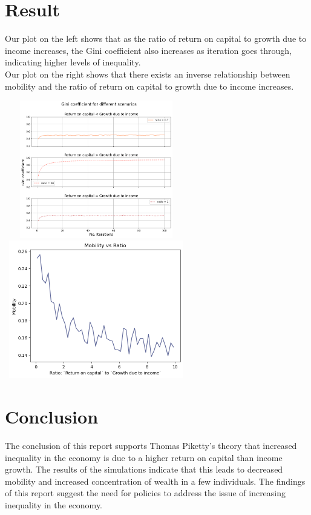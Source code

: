 \documentclass{article}
\begin{document}
\section*{Result}
\vspace{-0.3cm}

Our plot on the left shows that as the ratio of return on capital to growth due to income increases, 
the Gini coefficient also increases as iteration goes through, indicating higher levels of inequality. \\
Our plot on the right shows that there exists an inverse relationship between mobility and the ratio of return on capital to growth due to income increases.

\vspace{0.3cm}
\includegraphics[width=8cm,height=6cm]{ratio_comparison.png}
\hspace{0.2cm}
\includegraphics[width=8cm,height=6cm]{Mobility.png}

\vspace{-0.4cm}
\section*{Conclusion}
The conclusion of this report supports Thomas Piketty's theory that increased inequality in the economy is due to a higher
return on capital than income growth.
The results of the simulations indicate that this leads to decreased mobility and increased 
concentration of wealth in a few individuals. The findings of this report suggest the need for policies to 
address the issue of increasing inequality in the economy.
\end{document}
